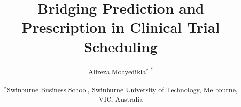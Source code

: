 \makeatletter
\renewcommand{\maketitle}{
  \begin{flushleft}
    {\LARGE\bfseries \@title \par}
    \vskip 1em
    {\large Alireza Moayedikia\textsuperscript{a,*} \par}
    \vskip 0.5em
    {\small \textsuperscript{a}Swinburne Business School, Swinburne University of Technology, Melbourne, VIC, Australia \par}
  \end{flushleft}
  \vskip 1.5em
}
\makeatother
\documentclass[11pt,a4paper]{article}

\usepackage[utf8]{inputenc}
\usepackage[T1]{fontenc}
\usepackage{amsmath,amssymb}
\usepackage{graphicx}
\usepackage{natbib}
\usepackage[margin=1in]{geometry}
\usepackage{setspace}
\usepackage{booktabs}
\usepackage{hyperref}
\usepackage{xcolor}
\usepackage{algorithm}
\usepackage{algpseudocode}



\onehalfspacing

\title{Bridging Prediction and Prescription in Clinical Trial Scheduling}

\author{Alireza Moayedikia\textsuperscript{a,*}}

\date{\vspace{-1em}\small \textsuperscript{a}Swinburne Business School, Swinburne University of Technology, Melbourne, VIC, Australia}



\maketitle

\renewcommand{\thefootnote}{*}
\renewcommand{\thefootnote}{\arabic{footnote}}

